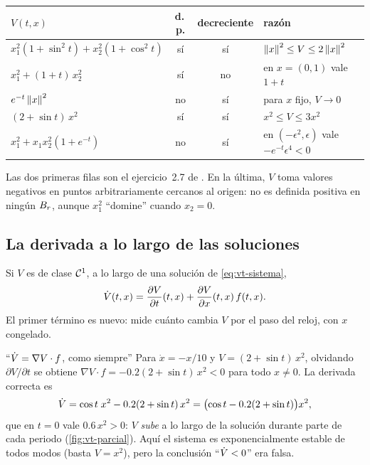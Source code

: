\begin{center}
\small
\begin{tabular}{@{}lccl@{}}
\toprule
$V(t,x)$ & d.\,p. & decreciente & razón \\
\midrule
$x_1^2(1+\sin^2t)+x_2^2(1+\cos^2t)$ & sí & sí & $\left\lVert x\right\rVert^2\le V\le2\left\lVert x\right\rVert^2$ \\
$x_1^2+(1+t)\,x_2^2$ & sí & no & en $x=(0,1)$ vale $1+t$ \\
$e^{-t}\left\lVert x\right\rVert^2$ & no & sí & para $x$ fijo, $V\to0$ \\
$(2+\sin t)\,x^2$ & sí & sí & $x^2\le V\le3x^2$ \\
$x_1^2+x_1x_2^2(1+e^{-t})$ & no & sí & en $(-\epsilon^2,\epsilon)$ vale $-e^{-t}\epsilon^4<0$ \\
\bottomrule
\end{tabular}
\end{center}

Las dos primeras filas son el ejercicio~2.7 de \citet{KeBr23}. En la última, $V$ toma valores negativos en puntos arbitrariamente cercanos al origen: no es definida positiva en ningún $B_{r}$, aunque $x_1^2$ ``domine'' cuando $x_2=0$.

\subsection{La derivada a lo largo de las soluciones}

Si $V$ es de clase $\mathcal{C}^{1}$, a lo largo de una solución de \eqref{eq:vt-sistema},
\begin{equation}
  \dot V(t,x)=\frac{\partial V}{\partial t}(t,x)+\frac{\partial V}{\partial x}(t,x)\,f(t,x) .
  \label{eq:vt-vdot}
\end{equation}
El primer término es nuevo: mide cuánto cambia $V$ por el paso del reloj, con $x$ congelado.

\begin{trampa}[label=tr:vt-parcial]{``$\dot V=\nabla V\cdot f$, como siempre''}
Para $\dot x=-x/10$ y $V=(2+\sin t)\,x^2$, olvidando $\partial V/\partial t$ se obtiene $\nabla V\cdot f=-0.2(2+\sin t)\,x^2<0$ para todo $x\neq0$. La derivada correcta es
\[
  \dot V=\cos t\;x^2-0.2(2+\sin t)\,x^2=\bigl(\cos t-0.2(2+\sin t)\bigr)x^2 ,
\]
que en $t=0$ vale $0.6\,x^2>0$: $V$ \emph{sube} a lo largo de la solución durante parte de cada periodo (\cref{fig:vt-parcial}). Aquí el sistema es exponencialmente estable de todos modos (basta $V=x^2$), pero la conclusión ``$\dot V<0$'' era falsa.
\end{trampa}

